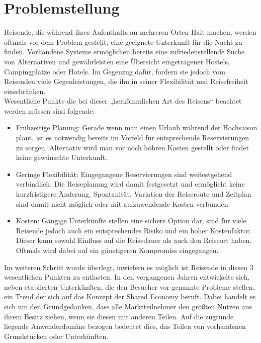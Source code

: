 
\section{Problemstellung}
Reisende, die während ihres Aufenthalts an mehreren Orten Halt machen, werden oftmals vor dem Problem gestellt, eine geeignete Unterkunft für die Nacht zu finden. Vorhandene Systeme ermöglichen bereits eine zufriedenstellende Suche von Alternativen und gewährleisten eine Übersicht eingetragener Hostels, Campingplätze oder Hotels. Im Gegenzug dafür, fordern sie jedoch vom Reisenden viele Gegenleistungen, die ihn in seiner Flexibilität und Reisefreiheit einschränken.\\
Wesentliche Punkte die bei dieser „herkömmlichen Art des Reisens“ beachtet werden müssen sind folgende:
\begin{itemize}
   \item Frühzeitige Planung: Gerade wenn man einen Urlaub während der Hochsaison plant, ist es notwendig bereits im Vorfeld für entsprechende Reservierungen zu sorgen. Alternativ wird man vor noch höhren Kosten gestellt oder findet keine gewünschte Unterkunft. 
   \item Geringe Flexibilität: Eingegangene Reservierungen sind weitestgehend verbindlich. Die Reiseplanung wird damit festgesetzt und ermöglicht keine kurzfristigere Änderung. Spontanität, Variation der Reiseroute und Zeitplan sind damit nicht möglich oder mit aufzuwendende Kosten verbunden.
   \item Kosten: Gängige Unterkünfte stellen eine sichere Option dar, sind für viele Reisende jedoch auch ein entsprechendes Risiko und ein hoher Kostenfaktor. Dieser kann sowohl Einfluss auf die Reisedauer als auch den Reiseort haben. Oftmals wird dabei auf ein günstigeren Kompromiss eingegangen. 

\end{itemize}

Im weiteren Schritt wurde überlegt, inwiefern es möglich ist  Reisende in diesen 3 wesentlichen Punkten zu entlasten.
In den vergangenen Jahren entwickelte sich, neben etablierten Unterkünften, die den Besucher vor genannte Probleme stellen, ein Trend der sich auf das Konzept der Shared Economy beruft. Dabei handelt es sich um den Grundgedanken, dass alle Marktteilnehmer den größten Nutzen aus ihrem Besitz ziehen, wenn sie diesen mit anderen Teilen. 
Auf die zugrunde liegende Anwenderdomäne bezogen bedeutet dies, das Teilen von vorhandenen Grundstücken oder Unterkünften.  


